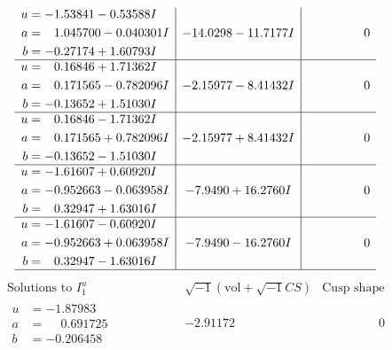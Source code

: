 \documentclass[1p]{elsarticle_modified}
\theoremstyle{definition}
\newcommand{\I}{\sqrt{-1}}
\begin{document}
$$\begin{array}{c|c|c}
\begin{aligned}
u &= -1.53841 - 0.53588 I \\
a &= \phantom{-}1.045700 - 0.040301 I \\
b &= -0.27174 + 1.60793 I\end{aligned}
 & -14.0298 - 11.7177 I & \phantom{-0.000000 } 0 \\ \hline\begin{aligned}
u &= \phantom{-}0.16846 + 1.71362 I \\
a &= \phantom{-}0.171565 - 0.782096 I \\
b &= -0.13652 + 1.51030 I\end{aligned}
 & -2.15977 - 8.41432 I & \phantom{-0.000000 } 0 \\ \hline\begin{aligned}
u &= \phantom{-}0.16846 - 1.71362 I \\
a &= \phantom{-}0.171565 + 0.782096 I \\
b &= -0.13652 - 1.51030 I\end{aligned}
 & -2.15977 + 8.41432 I & \phantom{-0.000000 } 0 \\ \hline\begin{aligned}
u &= -1.61607 + 0.60920 I \\
a &= -0.952663 - 0.063958 I \\
b &= \phantom{-}0.32947 + 1.63016 I\end{aligned}
 & -7.9490 + 16.2760 I & \phantom{-0.000000 } 0 \\ \hline\begin{aligned}
u &= -1.61607 - 0.60920 I \\
a &= -0.952663 + 0.063958 I \\
b &= \phantom{-}0.32947 - 1.63016 I\end{aligned}
 & -7.9490 - 16.2760 I & \phantom{-0.000000 } 0\\
 \hline 
 \end{array}$$\newpage$$\begin{array}{c|c|c}  
\text{Solutions to }I^u_{1}& \I (\text{vol} + \sqrt{-1}CS) & \text{Cusp shape}\\
 \hline 
\begin{aligned}
u &= -1.87983\phantom{ +0.000000I} \\
a &= \phantom{-}0.691725\phantom{ +0.000000I} \\
b &= -0.206458\phantom{ +0.000000I}\end{aligned}
 & -2.91172\phantom{ +0.000000I} & \phantom{-0.000000 } 0 \\ \hline\begin{aligned}

\end{aligned}
\end{array}$$
\end{document}

